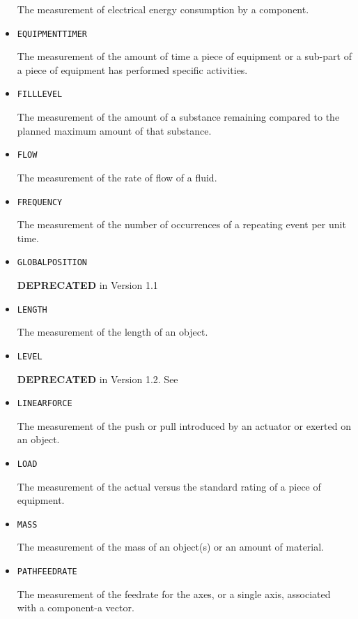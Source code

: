 \begin{itemize}
The measurement of electrical energy consumption by a component.


\item \texttt{EQUIPMENT\textunderscore TIMER}  

The measurement of the amount of time a piece of equipment or a sub-part of a piece of equipment has performed specific activities.


\item \texttt{FILL\textunderscore LEVEL}  

The measurement of the amount of a substance remaining compared to the planned maximum amount of that substance.


\item \texttt{FLOW}  

The measurement of the rate of flow of a fluid.


\item \texttt{FREQUENCY}  

The measurement of the number of occurrences of a repeating event per unit time.


\item \texttt{GLOBAL\textunderscore POSITION}  

\textbf{DEPRECATED} in Version 1.1


\item \texttt{LENGTH}  

The measurement of the length of an object.


\item \texttt{LEVEL}  

\textbf{DEPRECATED} in Version 1.2.  See 


\item \texttt{LINEAR\textunderscore FORCE}  

The measurement of the push or pull introduced by an actuator or exerted on an object.


\item \texttt{LOAD}  

The measurement of the actual versus the standard rating of a piece of equipment.


\item \texttt{MASS}  

The measurement of the mass of an object(s) or an amount of material.


\item \texttt{PATH\textunderscore FEEDRATE}  

The measurement of the feedrate for the axes, or a single axis, associated with a  component-a vector.



\end{itemize}
